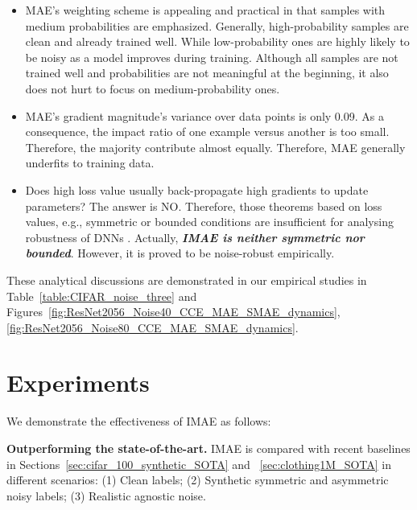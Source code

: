 \documentclass{article}
\begin{document}
\begin{itemize}


	\vspace{-0.3cm}
	\item {MAE's weighting scheme is appealing and practical} 
	in that samples with medium probabilities are emphasized.
Generally, high-probability samples are clean and already trained well. 
	While low-probability ones are highly likely to be noisy as a model improves during training. 
	Although all samples are not trained well and probabilities are not meaningful at the beginning, it also does not hurt to focus on medium-probability ones.    
	\item {MAE's gradient magnitude's variance over data points is only 0.09}. As a consequence, the impact ratio of one example versus another is too small. Therefore, the majority contribute almost equally. {Therefore, MAE generally underfits to  training data.} 
	
	\vspace{-0.2cm}
	\item Does high loss value usually back-propagate high gradients to update parameters? The answer is NO. Therefore, those theorems based on loss values, e.g., symmetric or bounded conditions are insufficient for analysing robustness of DNNs \cite{ghosh2017robust}.    
	Actually, \textit{\textbf{IMAE is neither symmetric nor bounded}}. However, it is proved to be noise-robust empirically. 
\end{itemize}
\vspace{-0.2cm}
These analytical discussions are demonstrated in our empirical studies in Table~\ref{table:CIFAR_noise_three} and Figures~\ref{fig:ResNet2056_Noise40_CCE_MAE_SMAE_dynamics}, \ref{fig:ResNet2056_Noise80_CCE_MAE_SMAE_dynamics}. 

















\section{Experiments}
\label{sec:experiments}

We demonstrate the effectiveness of IMAE as follows: 


\noindent
\textbf{Outperforming the state-of-the-art.} 
IMAE is compared with recent baselines in Sections~\ref{sec:cifar_100_synthetic_SOTA} and ~\ref{sec:clothing1M_SOTA} in different scenarios: (1) Clean labels; (2) Synthetic symmetric and asymmetric noisy labels; (3) Realistic agnostic noise. 
\end{document}

